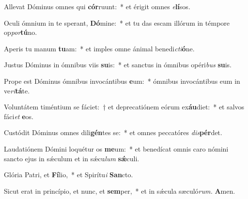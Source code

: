 \item Allevat Dóminus omnes qui \textbf{cór}ruunt:~* et érigit omnes \textit{e}\textbf{lí}sos.
\item Oculi ómnium in te sperant, \textbf{Dó}mine:~* et tu das escam illórum in témpore op\teenyhspace\textit{por}\textbf{tú}no.
\item Aperis tu manum \textbf{tu}am:~* et imples omne ánimal benedi\tinyhspace\textit{cti}\textbf{ó}ne.
\item Justus Dóminus in ómnibus viis \textbf{su}is:~* et sanctus in ómnibus opéri\textit{bus} \textbf{su}is.
\item Prope est Dóminus ómnibus invocántibus \textbf{e}um:~* ómnibus invocántibus eum in ve\tinyhspace\textit{ri}\textbf{tá}te.
\item Voluntátem timéntium se fáciet:~† et deprecatiónem eórum ex\textbf{áu}diet:~* et salvos fáci\tinyhspace\textit{et} \textbf{e}os.
\item Custódit Dóminus omnes dili\textbf{gén}tes se:~* et omnes peccatóres \textit{dis}\textbf{pér}det.
\item Laudatiónem Dómini loquétur os \textbf{me}um:~* et benedícat omnis caro nómini sancto ejus in sǽculum et in sǽcu\tinyhspace\textit{lum} \textbf{sǽ}culi.
\item Glória Patri, et \textbf{Fí}lio,~* et Spirítu\tinyhspace\textit{i} \textbf{San}cto.
\item Sicut erat in princípio, et nunc, et \textbf{sem}per,~* et in sǽcula sæculó\textit{rum.} \textbf{A}men.